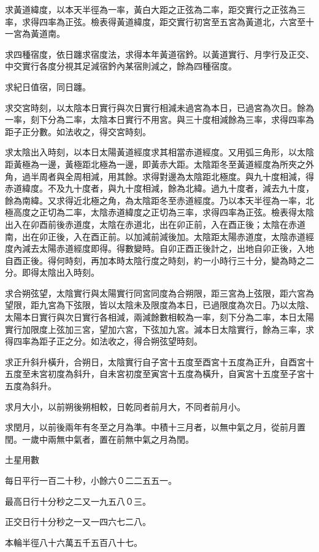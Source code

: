 \begin{pinyinscope}
求黃道緯度，以本天半徑為一率，黃白大距之正弦為二率，距交實行之正弦為三率，求得四率為正弦。檢表得黃道緯度，距交實行初宮至五宮為黃道北，六宮至十一宮為黃道南。

求四種宿度，依日躔求宿度法，求得本年黃道宿鈐。以黃道實行、月孛行及正交、中交實行各度分視其足減宿鈐內某宿則減之，餘為四種宿度。

求紀日值宿，同日躔。

求交宮時刻，以太陰本日實行與次日實行相減未過宮為本日，已過宮為次日。餘為一率，刻下分為二率，太陰本日實行不用宮。與三十度相減餘為三率，求得四率為距子正分數。如法收之，得交宮時刻。

求太陰出入時刻，以本日太陽黃道經度求其相當赤道經度。又用弧三角形，以太陰距黃極為一邊，黃極距北極為一邊，即黃赤大距。太陰距冬至黃道經度為所夾之外角，過半周者與全周相減，用其餘。求得對邊為太陰距北極度。與九十度相減，得赤道緯度。不及九十度者，與九十度相減，餘為北緯。過九十度者，減去九十度，餘為南緯。又求得近北極之角，為太陰距冬至赤道經度。乃以本天半徑為一率，北極高度之正切為二率，太陰赤道緯度之正切為三率，求得四率為正弦。檢表得太陰出入在卯酉前後赤道度，太陰在赤道北，出在卯正前，入在酉正後；太陰在赤道南，出在卯正後，入在酉正前。以加減前減後加。太陰距太陽赤道度，太陰赤道經度內減去太陽赤道經度即得。得數變時。自卯正酉正後計之，出地自卯正後，入地自酉正後。得何時刻，再加本時太陰行度之時刻，約一小時行三十分，變為時之二分。即得太陰出入時刻。

求合朔弦望，太陰實行與太陽實行同宮同度為合朔限，距三宮為上弦限，距六宮為望限，距九宮為下弦限，皆以太陰未及限度為本日，已過限度為次日。乃以太陰、太陽本日實行與次日實行各相減，兩減餘數相較為一率，刻下分為二率，本日太陽實行加限度上弦加三宮，望加六宮，下弦加九宮。減本日太陰實行，餘為三率，求得四率為距子正之分。如法收之，得合朔弦望時刻。

求正升斜升橫升，合朔日，太陰實行自子宮十五度至酉宮十五度為正升，自酉宮十五度至未宮初度為斜升，自未宮初度至寅宮十五度為橫升，自寅宮十五度至子宮十五度為斜升。

求月大小，以前朔後朔相較，日乾同者前月大，不同者前月小。

求閏月，以前後兩年有冬至之月為準。中積十三月者，以無中氣之月，從前月置閏。一歲中兩無中氣者，置在前無中氣之月為閏。

土星用數

每日平行一百二十秒，小餘六０二二五五一。

最高日行十分秒之二又一九五八０三。

正交日行十分秒之一又一四六七二八。

本輪半徑八十六萬五千五百八十七。


\end{pinyinscope}
